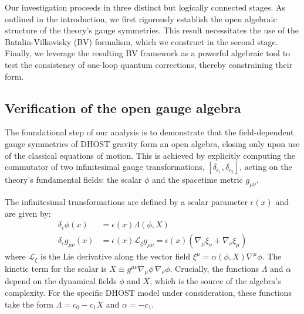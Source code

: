\documentclass[twocolumn]{aastex631}
\begin{document}
Our investigation proceeds in three distinct but logically connected stages. As outlined in the introduction, we first rigorously establish the open algebraic structure of the theory's gauge symmetries. This result necessitates the use of the Batalin-Vilkovisky (BV) formalism, which we construct in the second stage. Finally, we leverage the resulting BV framework as a powerful algebraic tool to test the consistency of one-loop quantum corrections, thereby constraining their form.

\subsection{Verification of the open gauge algebra}
The foundational step of our analysis is to demonstrate that the field-dependent gauge symmetries of DHOST gravity form an open algebra, closing only upon use of the classical equations of motion. This is achieved by explicitly computing the commutator of two infinitesimal gauge transformations, $[\delta_{\epsilon_1}, \delta_{\epsilon_2}]$, acting on the theory's fundamental fields: the scalar $\phi$ and the spacetime metric $g_{\mu\nu}$.

The infinitesimal transformations are defined by a scalar parameter $\epsilon(x)$ and are given by:
\begin{align}
\delta_\epsilon \phi(x) &= \epsilon(x) \Lambda(\phi, X) \label{eq:transf_phi} \\
\delta_\epsilon g_{\mu\nu}(x) &= \epsilon(x) \mathcal{L}_{\xi} g_{\mu\nu} = \epsilon(x) (\nabla_\mu \xi_\nu + \nabla_\nu \xi_\mu) \label{eq:transf_g}
\end{align}
where $\mathcal{L}_{\xi}$ is the Lie derivative along the vector field $\xi^\mu = \alpha(\phi, X) \nabla^\mu \phi$. The kinetic term for the scalar is $X \equiv g^{\mu\nu}\nabla_\mu\phi\,\nabla_\nu\phi$. Crucially, the functions $\Lambda$ and $\alpha$ depend on the dynamical fields $\phi$ and $X$, which is the source of the algebra's complexity. For the specific DHOST model under consideration, these functions take the form $\Lambda = c_0 - c_1 X$ and $\alpha = -c_1$.
\end{document}

